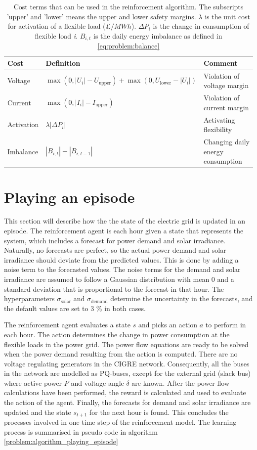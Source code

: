 \documentclass[class=book, crop=false, 11pt]{standalone}
\begin{document}
\begin{table}[ht]
\centering
\caption{Cost terms that can be used in the reinforcement algorithm. The subscripts 'upper' and 'lower' means the upper and lower safety margins. $\lambda$ is the unit cost for activation of a flexible load ($\pounds/MWh$). $\Delta P_{i}$ is the change in consumption of flexible load \textit{i}. $B_{i,t}$ is the daily energy imbalance as defined in \eqref{eq:problem:balance}}
\label{table:reward_terms}
\begin{tabular}{l|ll}

Cost  & Definition & Comment
\\ 
\hline
Voltage &
$\max(0,|U_{i}| - U_{\textrm{upper}}) + \max(0,U_{\textrm{lower}}- |U_{i}|)$ &
Violation of voltage margin
\\
Current &
$\max(0,|I_{i}| - I_{\textrm{upper}})$&
Violation of current margin
\\
Activation &
$\lambda |\Delta P_{i}|$&
Activating flexibility
\\
Imbalance &
$|B_{i,t}|- |B_{i,t-1}|$&
\makecell[l]{Changing daily energy \\consumption}
\\
\hline
\end{tabular}
\end{table}

\section{Playing an episode}
This section will describe how the the state of the electric grid is updated in an episode. The reinforcement agent is each hour given a state that represents the system, which includes a forecast for power demand and solar irradiance. Naturally, no forecasts are perfect, so the actual power demand and solar irradiance should deviate from the predicted values. This is done by adding a noise term to the forecasted values. The noise terms for the demand and solar irradiance are assumed to follow a Gaussian distribution with mean 0 and a standard deviation that is proportional to the forecast in that hour. The hyperparameters $\sigma_{\textrm{solar}}$ and $\sigma_{\textrm{demand}}$ determine the uncertainty in the forecasts, and the default values are set to 3 \% in both cases.

The reinforcement agent evaluates a state $s$ and picks an action $a$ to perform in each hour. The action determines the change in power consumption at the flexible loads in the power grid. The power flow equations are ready to be solved when the power demand resulting from the action is computed. There are no voltage regulating generators in the CIGRE network. Consequently, all the buses in the network are modelled as PQ-buses, except for the external grid (slack bus) where active power $P$ and voltage angle $\delta$ are known. After the power flow calculations have been performed, the reward is calculated and used to evaluate the action of the agent. Finally, the forecasts for demand and solar irradiance are updated and the state $s_{t+1}$ for the next hour is found. This concludes the processes involved in one time step of the reinforcement model. The learning process is summarised in pseudo code in algorithm \ref{problem:algorithm_playing_episode} 
\end{document}
